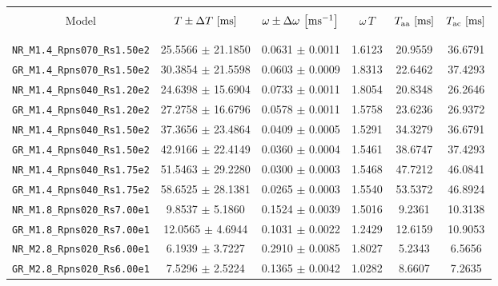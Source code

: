 \begin{table}[b]
  \scriptsize
  \renewcommand{\tabcolsep}{0.09cm}
  \centering
  \begin{tabularx}{0.75\textwidth}{cccccc} \\
    \toprule \\
    Model                                          &
    $T\pm\Delta T\,\left[\mathrm{ms}\right]$               &
    $\omega\pm\Delta\omega\,\left[\mathrm{ms}^{-1}\right]$ &
    $\omega\,T$                                    &
    $T_{\mathrm{aa}}\,\left[\mathrm{ms}\right]$                       &
    $T_{\mathrm{ac}}\,\left[\mathrm{ms}\right]$                       \\ \\
    \midrule \\
    \texttt{NR\_M1.4\_Rpns070\_Rs1.50e2} & 25.5566 $\pm$ 21.1850 & 0.0631 $\pm$ 0.0011 & 1.6123 & 20.9559 & 36.6791 \\
    \texttt{GR\_M1.4\_Rpns070\_Rs1.50e2} & 30.3854 $\pm$ 21.5598 & 0.0603 $\pm$ 0.0009 & 1.8313 & 22.6462 & 37.4293 \\
    \texttt{NR\_M1.4\_Rpns040\_Rs1.20e2} & 24.6398 $\pm$ 15.6904 & 0.0733 $\pm$ 0.0011 & 1.8054 & 20.8348 & 26.2646 \\
    \texttt{GR\_M1.4\_Rpns040\_Rs1.20e2} & 27.2758 $\pm$ 16.6796 & 0.0578 $\pm$ 0.0011 & 1.5758 & 23.6236 & 26.9372 \\
    \texttt{NR\_M1.4\_Rpns040\_Rs1.50e2} & 37.3656 $\pm$ 23.4864 & 0.0409 $\pm$ 0.0005 & 1.5291 & 34.3279 & 36.6791 \\
    \texttt{GR\_M1.4\_Rpns040\_Rs1.50e2} & 42.9166 $\pm$ 22.4149 & 0.0360 $\pm$ 0.0004 & 1.5461 & 38.6747 & 37.4293 \\
    \texttt{NR\_M1.4\_Rpns040\_Rs1.75e2} & 51.5463 $\pm$ 29.2280 & 0.0300 $\pm$ 0.0003 & 1.5468 & 47.7212 & 46.0841 \\
    \texttt{GR\_M1.4\_Rpns040\_Rs1.75e2} & 58.6525 $\pm$ 28.1381 & 0.0265 $\pm$ 0.0003 & 1.5540 & 53.5372 & 46.8924 \\
    \texttt{NR\_M1.8\_Rpns020\_Rs7.00e1} & 9.8537 $\pm$ 5.1860 & 0.1524 $\pm$ 0.0039 & 1.5016 & 9.2361 & 10.3138 \\
    \texttt{GR\_M1.8\_Rpns020\_Rs7.00e1} & 12.0565 $\pm$ 4.6944 & 0.1031 $\pm$ 0.0022 & 1.2429 & 12.6159 & 10.9053 \\
    \texttt{NR\_M2.8\_Rpns020\_Rs6.00e1} & 6.1939 $\pm$ 3.7227 & 0.2910 $\pm$ 0.0085 & 1.8027 & 5.2343 & 6.5656 \\
    \texttt{GR\_M2.8\_Rpns020\_Rs6.00e1} & 7.5296 $\pm$ 2.5224 & 0.1365 $\pm$ 0.0042 & 1.0282 & 8.6607 & 7.2635 \\

\end{tabularx}
\end{table}
